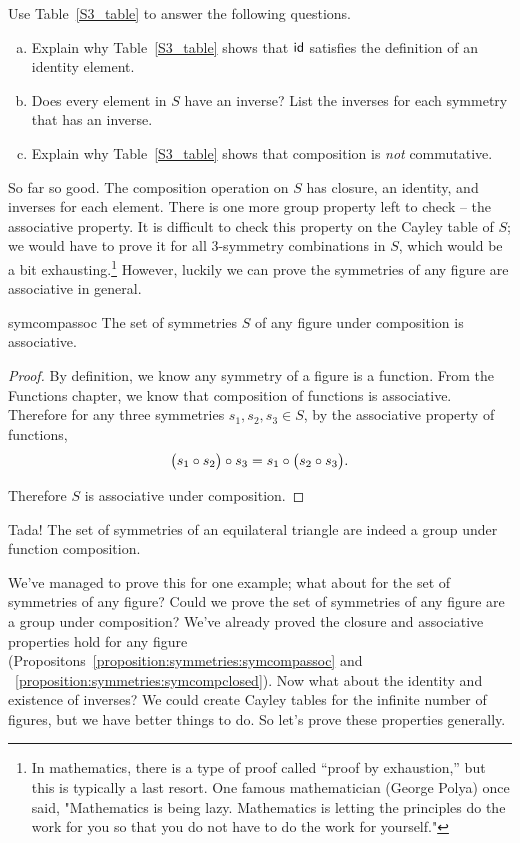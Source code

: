 \begin{exercise}{20}
Use Table~\ref{S3_table} to answer the following questions. 
\begin{enumerate}[(a)]
\item
Explain why Table~\ref{S3_table} shows that ${\sf{i}d}$ satisfies the definition of an identity element.
\item
Does every element in $S$ have an inverse?  List the inverses for each symmetry that has an inverse.
\item
Explain why Table~\ref{S3_table} shows that composition is \emph{not} commutative.
\end{enumerate}
\end{exercise}

So far so good.  The composition operation on $S$ has closure, an identity, and inverses for each element.  There is one more group property left to check -- the associative property. It is difficult to check this property on the Cayley table of $S$; we would have to prove it for all 3-symmetry combinations in $S$, which would be a bit exhausting.\footnote{In mathematics, there is a type of proof called ``proof by exhaustion,'' but this is typically a last resort. One famous mathematician (George Polya) once said, "Mathematics is being lazy. Mathematics is letting the principles do the work for you so that you do not have to do the work for yourself."}  
However, luckily we can prove the symmetries of any figure are associative in general.

\begin{prop}{symcompassoc}
The set of symmetries $S$ of any figure under composition is associative.
\end{prop}

\begin{proof}
By definition, we know any symmetry of a figure is a function.  From the Functions chapter, we know that composition of functions is associative.  Therefore for any three symmetries $s_1, s_2, s_3 \in S$, by the associative property of functions, 
\[ \bigl( s_1 \circ s_2 \bigr) \circ s_3 = s_1 \circ \bigl( s_2 \circ s_3 \bigr). \]

\noindent
Therefore $S$ is associative under composition.
\end{proof}
\medskip

Tada!  The set of symmetries of an equilateral triangle are indeed a group under function composition.  
\medskip

We've managed to prove this for one example; what about for the set of symmetries of any figure?  Could we prove the set of symmetries of any figure are a group under composition?  We've already proved the closure and associative properties hold for any figure (Propositons~\ref{proposition:symmetries:symcompassoc} and ~\ref{proposition:symmetries:symcompclosed}).  Now what about the identity and existence of inverses?  We could create Cayley tables for the infinite number of figures, but we have better things to do.  So let's prove these properties generally.  

